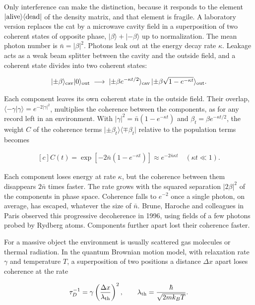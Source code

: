 \documentclass[11pt,oneside]{book}
\newenvironment{centeredalign}{\[\begin{gathered}[c]}{\end{gathered}\]}
\newcommand{\ket}[1]{\lvert #1\rangle}
\newcommand{\bra}[1]{\langle #1\rvert}
\begin{document}
Only interference can make the distinction, because it responds to the element \(\ket{\rm alive}\bra{\rm dead}\) of the density matrix, and that element is fragile. A laboratory version replaces the cat by a microwave cavity field in a superposition of two coherent states of opposite phase, \(\ket\beta+\ket{-\beta}\) up to normalization. The mean photon number is \(\bar n=|\beta|^2\). Photons leak out at the energy decay rate \(\kappa\). Leakage acts as a weak beam splitter between the cavity and the outside field, and a coherent state divides into two coherent states:

\begin{centeredalign}
\ket{\pm\beta}_{\rm cav}\ket0_{\rm out}\;\longrightarrow\;
\ket{\pm\beta e^{-\kappa t/2}}_{\rm cav}\,\ket{\pm\beta\sqrt{1-e^{-\kappa t}}}_{\rm out}.
\end{centeredalign}

Each component leaves its own coherent state in the outside field. Their overlap, \(\langle-\gamma|\gamma\rangle=e^{-2|\gamma|^2}\), multiplies the coherence between the components, as for any record left in an environment. With \(|\gamma|^2=\bar n(1-e^{-\kappa t})\) and \(\beta_t=\beta e^{-\kappa t/2}\), the weight \(C\) of the coherence terms \(\ket{\pm\beta_t}\bra{\mp\beta_t}\) relative to the population terms becomes

\begin{centeredalign}
C(t)=\exp\!\left[-2\bar n\left(1-e^{-\kappa t}\right)\right]
\approx e^{-2\bar n\kappa t}\quad(\kappa t\ll1).
\end{centeredalign}

Each component loses energy at rate \(\kappa\), but the coherence between them disappears \(2\bar n\) times faster. The rate grows with the squared separation \(|2\beta|^2\) of the components in phase space. Coherence falls to \(e^{-2}\) once a single photon, on average, has escaped, whatever the size of \(\bar n\). Brune, Haroche and colleagues in Paris observed this progressive decoherence in 1996, using fields of a few photons probed by Rydberg atoms. Components further apart lost their coherence faster.

For a massive object the environment is usually scattered gas molecules or thermal radiation. In the quantum Brownian motion model, with relaxation rate \(\gamma\) and temperature \(T\), a superposition of two positions a distance \(\Delta x\) apart loses coherence at the rate

\begin{centeredalign}
\tau_D^{-1}=\gamma\left(\frac{\Delta x}{\lambda_{\rm th}}\right)^2,\qquad
\lambda_{\rm th}=\frac{\hbar}{\sqrt{2mk_BT}}.
\end{centeredalign}
\end{document}
